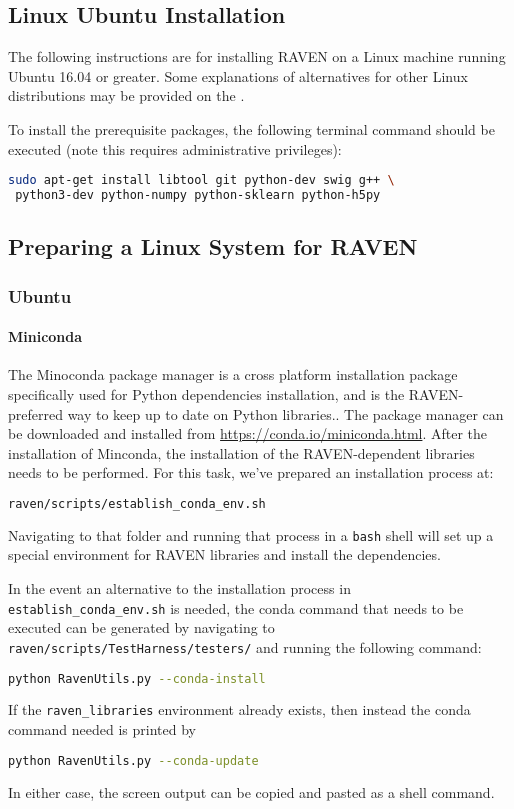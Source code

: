 \subsection{Linux Ubuntu Installation}
The following instructions are for installing RAVEN on a Linux machine running Ubuntu 16.04 or greater.  Some
explanations of alternatives for other Linux distributions may be provided on the \wiki.

To install the prerequisite packages, the following terminal command should be executed (note this requires
administrative privileges):

\begin{lstlisting}[language=bash]
 sudo apt-get install libtool git python-dev swig g++ \
 python3-dev python-numpy python-sklearn python-h5py
\end{lstlisting}



\subsection{Preparing a Linux System for RAVEN}
\label{sysprep_linux}

\subsubsection{Ubuntu}

\paragraph{Miniconda}
The Minoconda package manager is a cross platform installation package specifically
used for Python dependencies installation, and is the RAVEN-preferred way to keep up to date on
Python libraries..
The package manager can be downloaded and installed from \url{https://conda.io/miniconda.html}.
After the installation of Minconda, the installation of the RAVEN-dependent libraries needs to
be performed.  For this task, we've prepared an installation process at:
\begin{lstlisting}[language=bash]
  raven/scripts/establish_conda_env.sh
\end{lstlisting}
Navigating to that folder and running that process
in a \texttt{bash} shell will set up a special environment for RAVEN libraries and install the
dependencies.

In the event an alternative to the installation process in \texttt{establish\_conda\_env.sh} is needed,
the conda command that needs to be executed can be generated by navigating to
\texttt{raven/scripts/TestHarness/testers/} and running the following command:
\begin{lstlisting}[language=bash]
  python RavenUtils.py --conda-install
\end{lstlisting}
If the \texttt{raven\_libraries} environment already exists, then instead the conda command
needed is printed by
\begin{lstlisting}[language=bash]
  python RavenUtils.py --conda-update
\end{lstlisting}
In either case, the screen output can be copied and pasted as a shell command.

